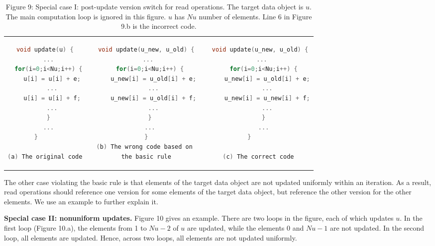 \begin{table*}
\centering
\begin{tabular}{c p{1cm} c p{1cm} c}
   \begin{lstlisting}[language=c++]
void update(u) {
  ...
  for(i=0;i<Nu;i++) {
    u[i] = u[i] + e;
    ...
    u[i] = u[i] + f;
    ...
  }
  ...
}     

(a) The original code
\end{lstlisting}
&
& \begin{lstlisting}[language=c++,escapechar=!]
void update(u_new, u_old) {
  ... 
  for(i=0;i<Nu;i++) {
    u_new[i] = u_old[i] + e;
    ...
    u_new[i] = u_old[i] + f;
    ...
  }
  ...
}
(b) The wrong code based on 
the basic rule
\end{lstlisting} 
&
& \begin{lstlisting}[language=c++]
void update(u_new, u_old) {
  ... 
  for(i=0;i<Nu;i++) {
    u_new[i] = u_old[i] + e;
    ...
    u_new[i] = u_new[i] + f;
    ...
  }
  ...
}      

(c) The correct code 
\end{lstlisting}\\
\end{tabular}
\caption*{Figure 9: Special case I: post-update version switch for read operations. The target data object is $u$. The main computation loop is ignored in this figure. $u$ has $Nu$ number of elements. Line 6 in Figure 9.b is the incorrect code.}
\label{table:special_case_I}
\vspace{-20pt}
\end{table*}

The other case violating the basic rule is that elements of the target data object
are not updated uniformly within an iteration.
As a result, read operations should reference one version for
some elements of the target data object, but reference the other
version for the other elements. 
We use an example to further explain it.

\textbf{Special case II: nonuniform updates.} 
Figure 10 gives an example. 
There are two loops in the figure, each of which updates $u$.
In the first loop (Figure 10.a), the elements from 1 to $Nu-2$ of $u$ are updated,
while the elements 0 and $Nu-1$ are not updated.
In the second loop, all elements are updated.
Hence, across two loops, all elements are not updated uniformly.

